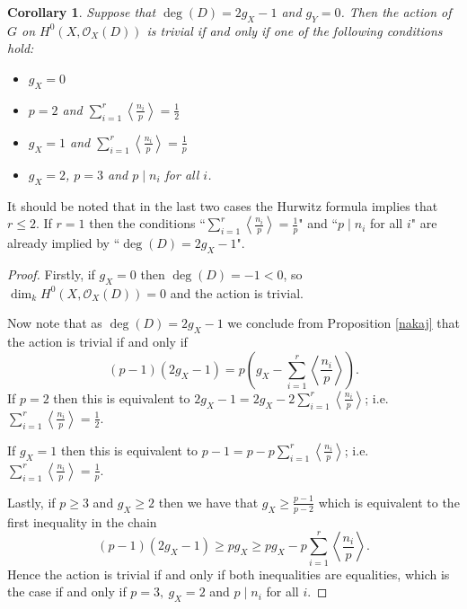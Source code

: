 \documentclass[11pt]{article} %
\newtheorem{cor}{Corollary}
\begin{document}
  \begin{cor}
    Suppose that $\deg(D)= 2g_X-1$ and $g_Y=0$. Then the action of $G$ on $H^0(X,\mathscr{O}_X(D))$ is trivial if and only if one of the following conditions hold:
      \begin{itemize}
	\item
	  $g_X=0$
	\item
	  $p=2$ and $\sum_{i=1}^r\left\langle\frac{n_i}{p}\right\rangle=\frac{1}{2}$
	\item
	  $g_X=1$ and $\sum_{i=1}^r\left\langle\frac{n_i}{p}\right\rangle=\frac{1}{p}$
	\item
	  $g_X=2$, $p=3$ and $p\mid n_i$ for all $i$.
      \end{itemize}
  \end{cor}
It should be noted that in the last two cases the Hurwitz formula implies that $r\leq 2$. 
If $r=1$ then the conditions ``$\sum_{i=1}^r\left\langle\frac{n_i}{p}\right\rangle=\frac{1}{p}$" and ``$p\mid n_i$ for all $i$" are already implied by ``$\deg(D)=2g_X-1$".
  \begin{proof}
    Firstly, if $g_X=0$ then $\deg(D)=-1<0$, so $\dim_kH^0(X,\mathscr{O}_X(D))=0$ and the action is trivial.

    Now note that as $\deg(D)=2g_X-1$ we conclude from Proposition \ref{nakaj} that the action is trivial if and only if 
      \begin{equation*}
	(p-1)(2g_X-1)=p\left(g_X-\sum_{i=1}^r\left\langle\frac{n_i}{p}\right\rangle\right).
      \end{equation*}
    If $p=2$ then this is equivalent to $2g_X-1=2g_X-2\sum_{i=1}^r\left\langle\frac{n_i}{p}\right\rangle$; i.e. $\sum_{i=1}^r\left\langle\frac{n_i}{p}\right\rangle=\frac{1}{2}$.

    If $g_X=1$ then this is equivalent to $p-1=p-p\sum_{i=1}^r\left\langle\frac{n_i}{p}\right\rangle$; i.e. $\sum_{i=1}^r\left\langle\frac{n_i}{p}\right\rangle=\frac{1}{p}$.

    Lastly, if $p\geq 3$ and $g_X\geq 2$ then we have that $g_X\geq \frac{p-1}{p-2}$ which is equivalent to the first inequality in the chain
      \begin{equation*}
	(p-1)(2g_X-1)\geq pg_X\geq pg_X-p\sum_{i=1}^r\left\langle\frac{n_i}{p}\right\rangle.
      \end{equation*}
    Hence the action is trivial if and only if both inequalities are equalities, which is the case if and only if $p=3,\ g_X=2$ and $p\mid n_i$ for all $i$.
  \end{proof}
\end{document}

